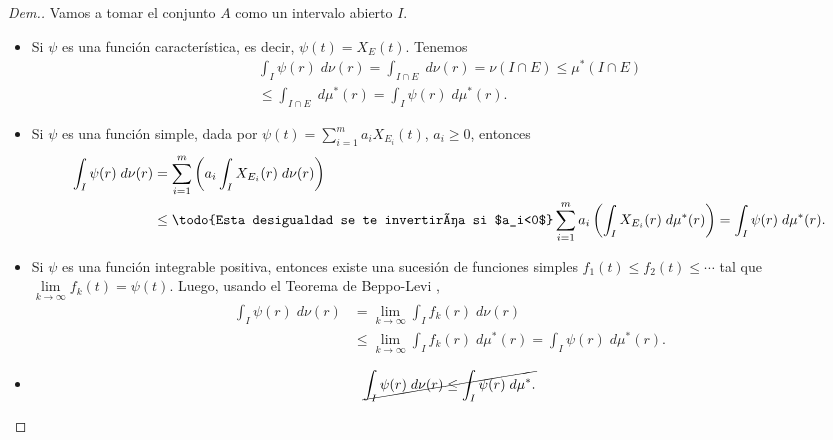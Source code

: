 \begin{proof}[Dem.]
 Vamos a  tomar el conjunto $A$ como un intervalo abierto $I$.\normalmarginpar{}
 
\begin{itemize}
	\item Si $\psi$ es una función característica, es decir, $\psi(t)=X_E(t)$. Tenemos
	\begin{multline*}
		\int_I \psi(r) \;d\nu(r)=\int_{I\cap E} \;d\nu(r)=\nu \left(I\cap E\right)\leq \mu^*\left(I\cap E\right)\\
		\leq\int_{I\cap E} \;d\mu^*(r)=\int_I\psi(r) \;d\mu^*(r).
	\end{multline*}
\item Si $\psi$ es una función simple, dada por $\psi(t)=\displaystyle\sum_{i=1}^{m}a_iX_{E_i}(t)$, $a_i\geq 0$, entonces
\begin{equation*}
\begin{split}
	\int_I \psi(r)\; d\nu(r)&=\sum_{i=1}^{m}\left( a_i\int_IX_{E_i}(r) \;d\nu(r)\right) \\ &\leq \textrm{\todo{Esta desigualdad se te invertiría si $a_i<0$}}
	\sum_{i=1}^{m}a_i\left( \int_IX_{E_i}(r) \;d\mu^*(r)\right) =\int_I \psi(r)\; d\mu^*(r).
 \end{split}
\end{equation*}
\item Si $\psi$ es una función integrable positiva, entonces existe una sucesión de funciones simples $f_1(t)\leq f_2(t)\leq\cdots$ tal que $\lim\limits_{k\to\infty}f_k(t)=\psi(t)$. Luego, usando  el Teorema de Beppo-Levi \cite[Teorema 5.6]{Zo},
\begin{equation*}
\begin{split}
	\int_I\psi(r)\;d\nu(r)&=\lim\limits_{k\to\infty}\int_I f_k(r)\;d\nu(r)\\
	&\leq \lim\limits_{k\to\infty}\int_I f_k(r)\;d\mu^*(r)=\int_I\psi(r)\;d\mu^*(r).
 \end{split}
\end{equation*}

	\item {}
$$\cancel{\int_I\psi(r)\;d\nu(r)\leq \int_I\psi(r)\;d\mu^*.}$$	

\end{itemize}


\end{proof} 






